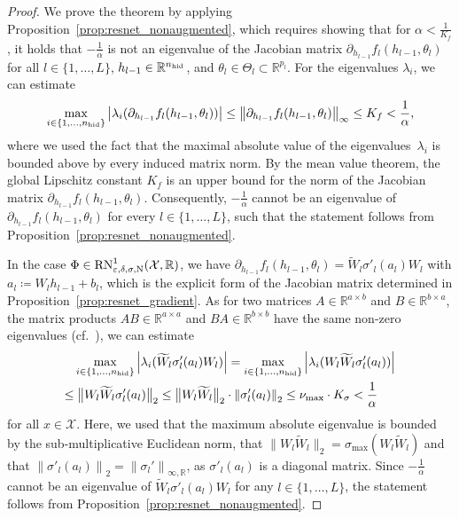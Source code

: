 \documentclass[10pt]{article}
\theoremstyle{definition}
\numberwithin{equation}{section}
\newcommand{\eps}{\varepsilon}
\newcommand\norm[1]{\left\lVert#1\right\rVert}
\newcommand\normm[1]{\big\lVert#1\big\lVert}
\newcommand\abs[1]{\left\lvert#1\right\rvert}
\newcommand{\R}{\mathbb{R}}
\newcommand*{\nhid}{n_\textup{hid}}
\begin{document}
\begin{proof}
	We prove the theorem by applying Proposition~\ref{prop:resnet_nonaugmented}, which requires showing that for $\alpha <\frac{1}{K_{f}}$, it holds that $- \frac{1}{\alpha}$ is not an eigenvalue of the Jacobian matrix $ \partial_{h_{l-1}}f_l(h_{l-1},\theta_l)$ for all $l \in \{1,\ldots,L\}$, $h_{l-1} \in \R^{\nhid}$, and $\theta_l \in \Theta_l \subset \R^{p_l}$. For the eigenvalues $\lambda_i$, we can estimate
	\begin{equation*}
		\max_{i \in \{1,\ldots,\nhid\}} \abs{ \lambda_i( \partial_{h_{l-1}}f_l(h_{l-1},\theta_l)) } \leq \norm{\partial_{h_{l-1}}f_l(h_{l-1},\theta_l)}_\infty \leq K_f < \frac{1}{\alpha},
	\end{equation*} 
	where we used the fact that the maximal absolute value of the eigenvalues~$\lambda_i$ is bounded above by every induced matrix norm. By the mean value theorem, the global Lipschitz constant $K_{f}$ is an upper bound for the norm of the Jacobian matrix $\partial_{h_{l-1}}f_l(h_{l-1},\theta_l)$. Consequently, $-\frac{1}{\alpha}$ cannot be an eigenvalue of $\partial_{h_{l-1}}f_l(h_{l-1},\theta_l)$ for every $l \in \{1,\ldots,L\}$, such that the statement follows from Proposition~\ref{prop:resnet_nonaugmented}.
	
	In the case $\Phi \in \textup{RN}^1_{\eps,\delta,\sigma,\textup{N}}(\mathcal{X},\R)$, we have $\partial_{h_{l-1}}f_l(h_{l-1},\theta_l) =  \widetilde{W}_{l}\sigma'_{l}(a_{l})W_{l}$ with $a_l \coloneqq W_l h_{l-1} + b_l$, which is the explicit form of the Jacobian matrix determined in Proposition~\ref{prop:resnet_gradient}. As for two matrices $A\in \R^{a\times b}$ and $B \in \R^{b \times a}$, the matrix products $AB \in \R^{a \times a}$ and $BA \in \R^{b \times b}$ have the same non-zero eigenvalues (cf.~\cite{Horn2012}), we can estimate
	\begin{align*}
		&\max_{i \in \{1,\ldots,\nhid\}} \abs{ \lambda_i(\widetilde{W}_l\sigma'_{l}(a_{l})W_{l}) } = \max_{i \in \{1,\ldots,\nhid\}} \abs{ \lambda_i(W_{l} \widetilde{W}_l\sigma'_{l}(a_{l})) } \\ 
        \leq & \;\normm{W_{l} \widetilde{W}_l \sigma'_{l}(a_{l})}_2 \leq \normm{W_{l} \widetilde{W}_l}_2 \cdot \norm{\sigma'_{l}(a_{l})}_2 \leq \nu_{\max} \cdot K_{\sigma} <\frac{1}{\alpha}
	\end{align*}
	for all $x \in \mathcal{X}$. Here, we used that the maximum absolute eigenvalue is bounded by the sub-multiplicative Euclidean norm, that $\normm{W_{l} \widetilde{W}_l}_2 = \sigma_{\max}(W_{l} \widetilde{W}_l)$ and that $\norm{\sigma'_{l}(a_{l})}_2  = \norm{\sigma_l'}_{\infty,\R}$, as $\sigma'_{l}(a_{l})$ is a diagonal matrix. Since $-\frac{1}{\alpha}$ cannot be an eigenvalue of $\widetilde{W}_l\sigma'_{l}(a_{l})W_{l}$ for any $l \in \{1,\ldots,L\}$, the statement follows from Proposition~\ref{prop:resnet_nonaugmented}.
\end{proof}
\end{document}
